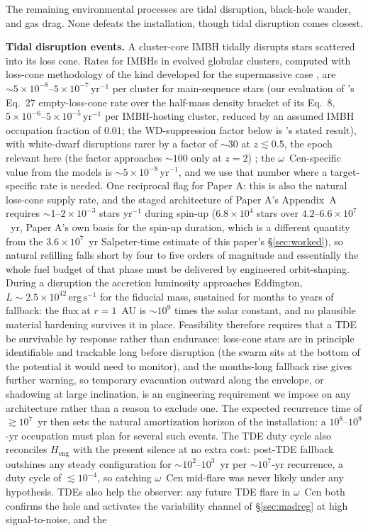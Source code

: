 \documentclass[11pt]{article}
\newcommand{\ocen}{\ensuremath{\omega}~Cen}
\newcommand{\Heng}{\ensuremath{H_{\mathrm{eng}}}}
\begin{document}
The remaining environmental processes are tidal disruption, black-hole wander, and gas drag. None defeats the installation, though tidal disruption comes closest.

\textbf{Tidal disruption events.} A cluster-core IMBH tidally disrupts stars scattered into its loss cone. Rates for IMBHs in evolved globular clusters, computed with loss-cone methodology of the kind developed for the supermassive case \citep{StoneMetzger2016}, are $\sim 5\times10^{-8}$--$5\times10^{-7}\,\mathrm{yr^{-1}}$ per cluster for main-sequence stars (our evaluation of \citet{Fragione2018}'s Eq.~27 empty-loss-cone rate over the half-mass density bracket of its Eq.~8, $5\times10^{-6}$--$5\times10^{-5}\,\mathrm{yr^{-1}}$ per IMBH-hosting cluster, reduced by an assumed IMBH occupation fraction of $0.01$; the WD-suppression factor below is \citet{Fragione2018}'s stated result), with white-dwarf disruptions rarer by a factor of $\sim 30$ at $z \lesssim 0.5$, the epoch relevant here (the factor approaches $\sim 100$ only at $z = 2$) \citep{Fragione2018}; the \ocen-specific value from the \citet{GonzalezPrieto2025} models is $\sim 5\times10^{-8}\,\mathrm{yr^{-1}}$, and we use that number where a target-specific rate is needed. One reciprocal flag for Paper A: this is also the natural loss-cone supply rate, and the staged architecture of Paper A's Appendix~A requires $\sim$1--$2\times10^{-3}$ stars yr$^{-1}$ during spin-up ($6.8\times10^{4}$ stars over $4.2$--$6.6\times10^{7}$~yr, Paper A's own basis for the spin-up duration, which is a different quantity from the $3.6\times10^{7}$~yr Salpeter-time estimate of this paper's \S\ref{sec:worked}), so natural refilling falls short by four to five orders of magnitude and essentially the whole fuel budget of that phase must be delivered by engineered orbit-shaping. During a disruption the accretion luminosity approaches Eddington, $L \sim 2.5\times10^{42}\,\mathrm{erg\,s^{-1}}$ for the fiducial mass, sustained for months to years of fallback: the flux at $r = 1$~AU is $\sim 10^{9}$ times the solar constant, and no plausible material hardening survives it in place. Feasibility therefore requires that a TDE be survivable by response rather than endurance: loss-cone stars are in principle identifiable and trackable long before disruption (the swarm sits at the bottom of the potential it would need to monitor), and the months-long fallback rise gives further warning, so temporary evacuation outward along the envelope, or shadowing at large inclination, is an engineering requirement we impose on any architecture rather than a reason to exclude one. The expected recurrence time of $\gtrsim 10^{7}$~yr then sets the natural amortization horizon of the installation: a $10^{8}$--$10^{9}$-yr occupation must plan for several such events. The TDE duty cycle also reconciles \Heng{} with the present silence at no extra cost: post-TDE fallback outshines any steady configuration for $\sim 10^{2}$--$10^{3}$~yr per $\sim 10^{7}$-yr recurrence, a duty cycle of $\lesssim 10^{-4}$, so catching \ocen{} mid-flare was never likely under any hypothesis. TDEs also help the observer: any future TDE flare in \ocen{} both confirms the hole and activates the variability channel of \S\ref{sec:madreg} at high signal-to-noise, and the 
\end{document}
